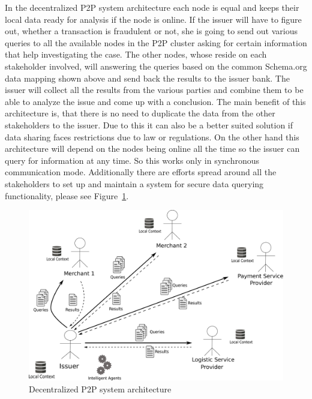In the decentralized P2P system architecture each node is equal and keeps their local data ready for analysis if the node is online. If the issuer will have to figure out, whether a transaction is fraudulent or not, she is going to send out various queries to all the available nodes in the P2P cluster asking for certain information that help investigating the case. The other nodes, whose reside on each stakeholder involved, will answering the queries based on the common Schema.org data mapping shown above and send back the results to the issuer bank. The issuer will collect all the results from the various parties and combine them to be able to analyze the issue and come up with a conclusion. The main benefit of this architecture is, that there is no need to duplicate the data from the other stakeholders to the issuer. Due to this it can also be a better suited solution if data sharing faces restrictions due to law or regulations. On the other hand this architecture will depend on the nodes being online all the time so the issuer can query for information at any time. So this works only in synchronous communication mode. Additionally there are efforts spread around all the stakeholders to set up and maintain a system for secure data querying functionality, please see Figure~\ref{fig:images_p2p_decentralized}.

\begin{figure}[H]
	\centering
		\includegraphics[width=0.9\columnwidth]{images/system_P2P_decentralized.pdf}
	\caption{Decentralized \gls{P2P} system architecture}
\label{fig:images_p2p_decentralized}
\end{figure}


